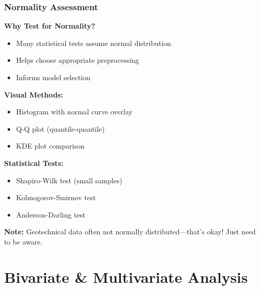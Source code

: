 \documentclass[aspectratio=169]{beamer}
\begin{document}
\begin{frame}
\frametitle{Normality Assessment}

\textbf{Why Test for Normality?}
\begin{itemize}
    \item Many statistical tests assume normal distribution
    \item Helps choose appropriate preprocessing
    \item Informs model selection
\end{itemize}

\vspace{0.5cm}

\textbf{Visual Methods:}
\begin{itemize}
    \item Histogram with normal curve overlay
    \item Q-Q plot (quantile-quantile)
    \item KDE plot comparison
\end{itemize}

\vspace{0.5cm}

\textbf{Statistical Tests:}
\begin{itemize}
    \item Shapiro-Wilk test (small samples)
    \item Kolmogorov-Smirnov test
    \item Anderson-Darling test
\end{itemize}

\vspace{0.3cm}

\textbf{Note:} Geotechnical data often not normally distributed—that's okay! Just need to be aware.

\end{frame}

\section{Bivariate \& Multivariate Analysis}
\end{document}
